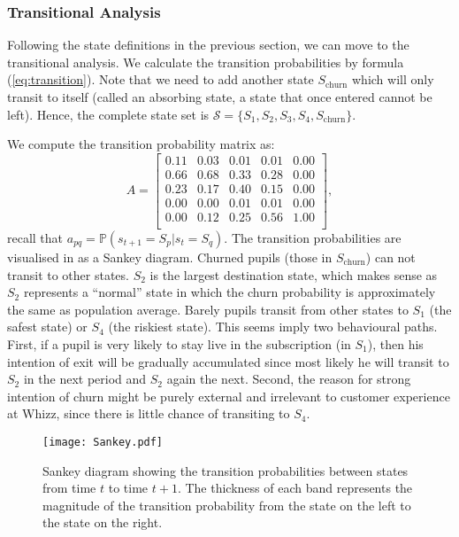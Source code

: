 \subsubsection{Transitional Analysis}

Following the state definitions in the previous section, we can move to the transitional analysis. We calculate the transition probabilities by formula (\ref{eq:transition}). Note that we need to add another state $S_\text{churn}$ which will only transit to itself (called an absorbing state, a state that once entered cannot be left). Hence, the complete state set is $\mathcal{S} = \{S_1, S_2, S_3, S_4, S_\text{churn}\}$.

We compute the transition probability matrix as:
\begin{equation}
A = 
\begin{bmatrix}
0.11 & 0.03 & 0.01 & 0.01 & 0.00 \\
0.66 & 0.68 & 0.33 & 0.28 & 0.00 \\
0.23 & 0.17 & 0.40 & 0.15 & 0.00 \\
0.00 & 0.00 & 0.01 & 0.01 & 0.00 \\
0.00 & 0.12 & 0.25 & 0.56 & 1.00 \\
\end{bmatrix},
\end{equation}
recall that $a_{pq} = \mathbb{P} (s_{t+1} = S_p | s_t = S_q)$. The transition probabilities are visualised in  as a Sankey diagram. Churned pupils (those in $S_\text{churn}$) can not transit to other states. $S_2$ is the largest destination state, which makes sense as $S_2$ represents a ``normal'' state in which the churn probability is approximately the same as population average. Barely pupils transit from other states to $S_1$ (the safest state) or $S_4$ (the riskiest state). This seems imply two behavioural paths. First, if a pupil is very likely to stay live in the subscription (in $S_1$), then his intention of exit will be gradually accumulated since most likely he will transit to $S_2$ in the next period and $S_2$ again the next. Second, the reason for strong intention of churn might be purely external and irrelevant to customer experience at Whizz, since there is little chance of transiting to $S_4$.

\begin{figure}[!h]
\centering
\texttt{[image: Sankey.pdf]}
\caption{Sankey diagram showing the transition probabilities between states from time $t$ to time $t+1$. The thickness of each band represents the magnitude of the transition probability from the state on the left to the state on the right.}
\label{fig:sankey}
\end{figure}

